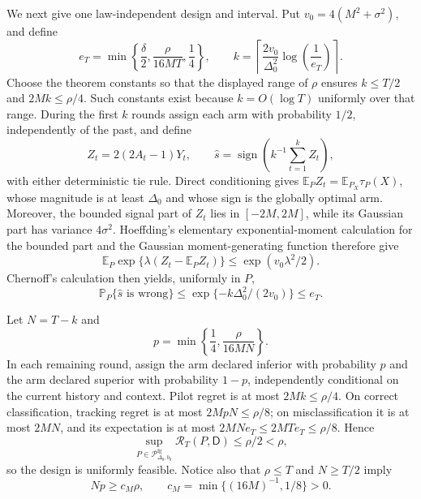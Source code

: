 We next give one law-independent design and interval.  Put \(v_0=4(M^2+\sigma^2)\), and define
\[
e_T=\min\left\{\frac\delta2,\frac{\rho}{16MT},\frac14\right\},
\qquad
k=\left\lceil\frac{2v_0}{\Delta_0^2}
\log\!\left(\frac{1}{e_T}\right)\right\rceil.
\]
Choose the theorem constants so that the displayed range of \(\rho\) ensures \(k\leq T/2\) and \(2Mk\leq\rho/4\).  Such constants exist because \(k=O(\log T)\) uniformly over that range.  During the first \(k\) rounds assign each arm with probability \(1/2\), independently of the past, and define
\[
Z_t=2(2A_t-1)Y_t,
\qquad
\widehat s=\operatorname{sign}\!\left(k^{-1}\sum_{t=1}^kZ_t\right),
\]
with either deterministic tie rule.  Direct conditioning gives \(\mathbb E_PZ_t=\mathbb E_{P_X}\tau_P(X)\), whose magnitude is at least \(\Delta_0\) and whose sign is the globally optimal arm.  Moreover, the bounded signal part of \(Z_t\) lies in \([-2M,2M]\), while its Gaussian part has variance \(4\sigma^2\).  Hoeffding's elementary exponential-moment calculation for the bounded part and the Gaussian moment-generating function therefore give
\[
\mathbb E_P\exp\{\lambda(Z_t-\mathbb E_PZ_t)\}
\leq\exp(v_0\lambda^2/2).
\]
Chernoff's calculation then yields, uniformly in \(P\),
\[
\mathbb P_P\{\widehat s\text{ is wrong}\}
\leq\exp\{-k\Delta_0^2/(2v_0)\}\leq e_T.
\]

Let \(N=T-k\) and
\[
p=\min\left\{\frac14,\frac{\rho}{16MN}\right\}.
\]
In each remaining round, assign the arm declared inferior with probability \(p\) and the arm declared superior with probability \(1-p\), independently conditional on the current history and context.  Pilot regret is at most \(2Mk\leq\rho/4\).  On correct classification, tracking regret is at most \(2MpN\leq\rho/8\); on misclassification it is at most \(2MN\), and its expectation is at most \(2MNe_T\leq2MTe_T\leq\rho/8\).  Hence
\[
\sup_{P\in\mathcal P_{\Delta_0,b_0}^{\mathrm{fg}}}
\mathcal R_T(P,\mathsf D)\leq\rho/2<\rho,
\]
so the design is uniformly feasible.  Notice also that \(\rho\leq T\) and \(N\geq T/2\) imply
\[
Np\geq c_M\rho,
\qquad
c_M=\min\{(16M)^{-1},1/8\}>0.
\]

